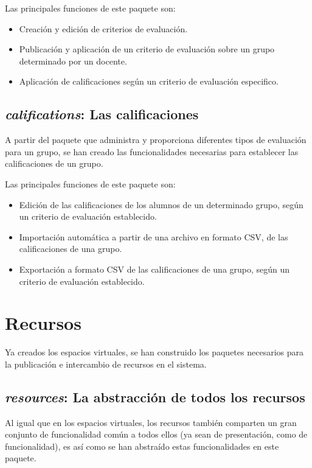Las principales funciones de este paquete son:

\begin{itemize}
\item Creación y edición de criterios de evaluación.
\item Publicación y aplicación de un criterio de evaluación sobre un grupo
determinado por un docente.
\item Aplicación de calificaciones según un criterio de evaluación especifico.
\end{itemize}

\subsection{\emph{califications}: Las calificaciones}
A partir del paquete que administra y proporciona diferentes tipos de evaluación
para un grupo, se han creado las funcionalidades necesarias para establecer las
calificaciones de un grupo.

Las principales funciones de este paquete son:

\begin{itemize}
\item Edición de las calificaciones de los alumnos de un determinado grupo,
según un criterio de evaluación establecido.
\item Importación automática a partir de una archivo en formato CSV, de las
calificaciones de una grupo.
\item Exportación a formato CSV de las calificaciones de una grupo, según un
criterio de evaluación establecido.
\end{itemize}

\section{Recursos}
Ya creados los espacios virtuales, se han construido los paquetes necesarios
para la publicación e intercambio de recursos en el sistema.

\subsection{\emph{resources}: La abstracción de todos los recursos}
Al igual que en los espacios virtuales, los recursos también comparten un gran
conjunto de funcionalidad común a todos ellos (ya sean de presentación, como de
funcionalidad), es así como se han abstraído estas funcionalidades en este
paquete.

